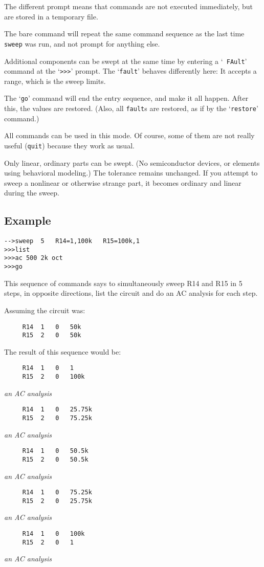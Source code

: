 The different prompt means that commands are not executed immediately, but
are stored in a temporary file.

The bare command will repeat the same command sequence as the last time {\tt
sweep} was run, and not prompt for anything else.

Additional components can be swept at the same time by entering a `{\tt
FAult}' command at the `{\tt >>>}' prompt.  The `{\tt fault}' behaves
differently here:  It accepts a range, which is the sweep limits.

The `{\tt go}' command will end the entry sequence, and make it all happen.
After this, the values are restored.  (Also, all {\tt fault}s are restored,
as if by the `{\tt restore}' command.)

All commands can be used in this mode.  Of course, some of them are not
really useful ({\tt quit}) because they work as usual.

Only linear, ordinary parts can be swept.  (No semiconductor devices, or
elements using behavioral modeling.)  The tolerance remains unchanged.  If
you attempt to sweep a nonlinear or otherwise strange part, it becomes
ordinary and linear during the sweep.
\subsection{Example}

\begin{verbatim}
-->sweep  5   R14=1,100k   R15=100k,1
>>>list
>>>ac 500 2k oct
>>>go
\end{verbatim}

This sequence of commands says to simultaneously sweep R14 and R15 in 5 steps,
in opposite directions, list the circuit and do an AC analysis for each step.

Assuming the circuit was:
\begin{verbatim}
     R14  1   0   50k
     R15  2   0   50k
\end{verbatim}

The result of this sequence would be:
\begin{verbatim}
     R14  1   0   1
     R15  2   0   100k
\end{verbatim}
{\rm {\it an AC analysis}}
\begin{verbatim}
     R14  1   0   25.75k
     R15  2   0   75.25k
\end{verbatim}
{\rm {\it an AC analysis}}
\begin{verbatim}
     R14  1   0   50.5k
     R15  2   0   50.5k
\end{verbatim}
{\rm {\it an AC analysis}}
\begin{verbatim}
     R14  1   0   75.25k
     R15  2   0   25.75k
\end{verbatim}
{\rm {\it an AC analysis}}
\begin{verbatim}
     R14  1   0   100k
     R15  2   0   1
\end{verbatim}
{\rm {\it an AC analysis}}

